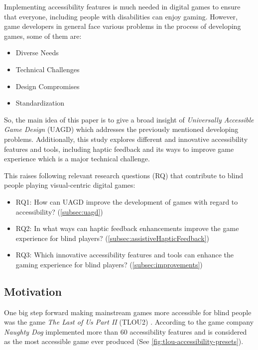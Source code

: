 \documentclass[sigconf,natbib=false,10pt]{acmart}
\begin{document}
	Implementing accessibility features is much needed in digital games to ensure that everyone, including people with disabilities can enjoy gaming.
	However, game developers in general face various problems in the process of developing games, some of them are:
	
	\begin{itemize}
		\setlength\itemsep{0.5em}
		\item Diverse Needs
		\item Technical Challenges
		\item Design Compromises
		\item Standardization
	\end{itemize}
	
	So, the main idea of this paper is to give a broad insight of \emph{Universally Accessible Game Design} (UAGD) which addresses the previously mentioned developing problems.
	Additionally, this study explores different and innovative accessibility features and tools, including haptic feedback and its ways to improve game experience which is a major technical challenge.
	
	This raises following relevant research questions (RQ) that contribute to blind people playing visual-centric digital games:
	
	\begin{itemize}
		\setlength\itemsep{0.5em}
		\item RQ1: How can UAGD improve the development of games with regard to accessibility? (\autoref{subsec:uagd})
		\item RQ2: In what ways can haptic feedback enhancements improve the game experience for blind players? (\autoref{subsec:assistiveHapticFeedback})
		\item RQ3: Which innovative accessibility features and tools can enhance the gaming experience for blind players? (\autoref{subsec:improvements})
	\end{itemize}

	\subsection{Motivation}
	One big step forward making mainstream games more accessible for blind people was the game \emph{The Last of Us Part II} (TLOU2) \cite{playstation_last_2020, playstation_last_2020-1}. 
	According to \textcite{leite_extended_2021} the game company \emph{Naughty Dog} implemented more than 60 accessibility features and is considered as the most accessible game ever produced (See \autoref{fig:tlou-accessibility-presets}).
	
\end{document}
